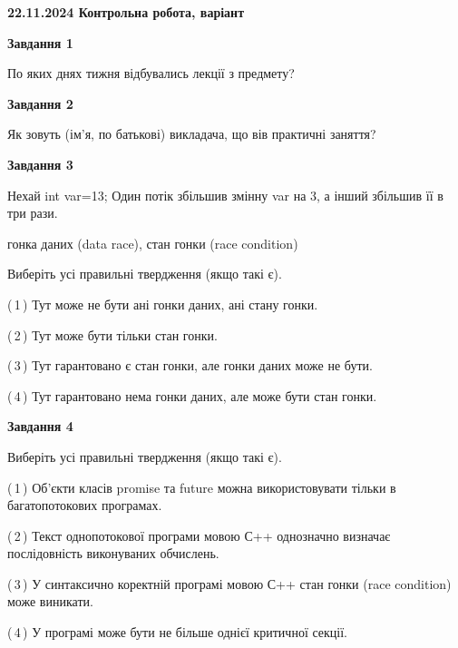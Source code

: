 \documentclass[12pt, ukrainian]{article}
\begin{document}
\begin {large}

\textbf{22.11.2024 Контрольна робота, варіант  }\par


{

\begin{center}
\textbf{Завдання 1}
\end{center}

По яких днях тижня відбувались лекції з предмету?


\begin{center}
\textbf{Завдання 2}
\end{center}

Як зовуть (ім'я, по батькові) викладача, що вів практичні заняття?


\begin{center}
\textbf{Завдання 3}
\end{center}

Нехай int var=13; Один потік збільшив змінну var на 3, а інший збільшив її в три рази.

гонка даних (data race), стан гонки (race condition)

Виберіть усі правильні твердження (якщо такі є).\par
\vspace{2mm}
(\,1\,) Тут може не бути ані гонки даних, ані стану гонки.%

(\,2\,) Тут може бути тільки стан гонки.%

(\,3\,) Тут гарантовано є стан гонки, але гонки даних може не бути.%

(\,4\,) Тут гарантовано нема гонки даних, але може бути стан гонки.%


\begin{center}
\textbf{Завдання 4}
\end{center}

Виберіть усі правильні твердження (якщо такі є).\par
\vspace{2mm}

(\,1\,) Об’єкти класів promise та future можна використовувати тільки в багатопотокових програмах.%

(\,2\,) Текст однопотокової програми мовою С++ однозначно визначає послідовність виконуваних обчислень.%

(\,3\,) У синтаксично коректній програмі мовою С++ стан гонки (race condition) може виникати.%

(\,4\,) У програмі може бути не більше однієї критичної секції.%


}
\end{large}
\end{document}
